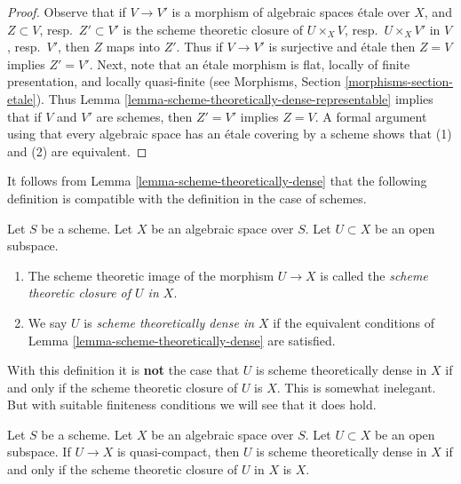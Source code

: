 \begin{proof}
Observe that if $V \to V'$ is a morphism of algebraic spaces \'etale
over $X$, and $Z \subset V$, resp.\ $Z' \subset V'$ is the scheme theoretic
closure of $U \times_X V$, resp.\ $U \times_X V'$ in $V$, resp.\ $V'$,
then $Z$ maps into $Z'$. Thus if $V \to V'$ is surjective and \'etale
then $Z = V$ implies $Z' = V'$. Next, note that an \'etale morphism is
flat, locally of finite presentation, and locally quasi-finite
(see Morphisms, Section \ref{morphisms-section-etale}).
Thus Lemma \ref{lemma-scheme-theoretically-dense-representable}
implies that if $V$ and $V'$ are schemes, then $Z' = V'$ implies
$Z = V$. A formal argument using that every algebraic space has an
\'etale covering by a scheme shows that (1) and (2) are equivalent.
\end{proof}

\noindent
It follows from
Lemma \ref{lemma-scheme-theoretically-dense}
that the following definition is compatible with the definition
in the case of schemes.

\begin{definition}
\label{definition-scheme-theoretically-dense}
Let $S$ be a scheme.
Let $X$ be an algebraic space over $S$.
Let $U \subset X$ be an open subspace.
\begin{enumerate}
\item The scheme theoretic image of the morphism $U \to X$
is called the {\it scheme theoretic closure of $U$ in $X$}.
\item We say $U$ is {\it scheme theoretically dense in $X$}
if the equivalent conditions of
Lemma \ref{lemma-scheme-theoretically-dense} are satisfied.
\end{enumerate}
\end{definition}

\noindent
With this definition it is {\bf not} the case that $U$ is scheme
theoretically dense in $X$ if and only if the scheme theoretic closure
of $U$ is $X$. This is somewhat inelegant. But with suitable
finiteness conditions we will see that it does hold.

\begin{lemma}
\label{lemma-scheme-theoretically-dense-quasi-compact}
Let $S$ be a scheme. Let $X$ be an algebraic space over $S$.
Let $U \subset X$ be an open subspace.
If $U \to X$ is quasi-compact, then $U$
is scheme theoretically dense in $X$ if and only if the scheme theoretic
closure of $U$ in $X$ is $X$.
\end{lemma}

